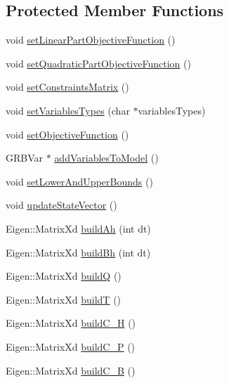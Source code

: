 \subsection*{\-Protected \-Member \-Functions}
\begin{DoxyCompactItemize}
\item 
void \hyperlink{classMIQPController_a2d882a4cd9e9832d8b9b2ad73111be0f}{set\-Linear\-Part\-Objective\-Function} ()
\item 
void \hyperlink{classMIQPController_ae61af28f2062b4372ce9c5cb37ebb161}{set\-Quadratic\-Part\-Objective\-Function} ()
\item 
void \hyperlink{classMIQPController_a65b06fe436dc1683ac56afcbed2e4cfe}{set\-Constraints\-Matrix} ()
\item 
void \hyperlink{classMIQPController_a3f15855fdab618e9f3b51c2b7df52b4e}{set\-Variables\-Types} (char $\ast$variables\-Types)
\item 
void \hyperlink{classMIQPController_a1bb6f0a6b520aa1ee18fe59c760f8aa8}{set\-Objective\-Function} ()
\item 
\-G\-R\-B\-Var $\ast$ \hyperlink{classMIQPController_a8a4200f8a98ec13b93dfab56eb5cc423}{add\-Variables\-To\-Model} ()
\item 
void \hyperlink{classMIQPController_a2caf42a5b5dcd63d67de57cfbb93c653}{set\-Lower\-And\-Upper\-Bounds} ()
\item 
void \hyperlink{classMIQPController_a8320465a1ec80d0cf7ba0d17652feba5}{update\-State\-Vector} ()
\item 
\-Eigen\-::\-Matrix\-Xd \hyperlink{classMIQPController_a4e8182e6a07c640462104b9ec0c07ed7}{build\-Ah} (int dt)
\item 
\-Eigen\-::\-Matrix\-Xd \hyperlink{classMIQPController_a2d9e1383d2abcdde62f3e80b0a9029b7}{build\-Bh} (int dt)
\item 
\-Eigen\-::\-Matrix\-Xd \hyperlink{classMIQPController_a62a9716bb29701613dd70514b72fb931}{build\-Q} ()
\item 
\-Eigen\-::\-Matrix\-Xd \hyperlink{classMIQPController_af8e6423e738bde67355a1395ace398e5}{build\-T} ()
\item 
\-Eigen\-::\-Matrix\-Xd \hyperlink{classMIQPController_a369508d75eddb3e2aec20fb868be5f6a}{build\-C\-\_\-\-H} ()
\item 
\-Eigen\-::\-Matrix\-Xd \hyperlink{classMIQPController_a9bf037d6c2e1ef897de38e8750da77ac}{build\-C\-\_\-\-P} ()
\item 
\-Eigen\-::\-Matrix\-Xd \hyperlink{classMIQPController_a68c8b2cf8778a931d9e4414ad7f6b995}{build\-C\-\_\-\-B} ()

\end{DoxyCompactItemize}
